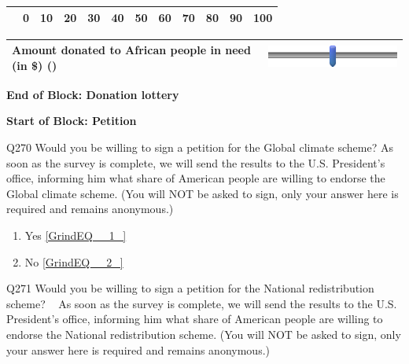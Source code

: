\documentclass{article} %
\begin{document}
\begin{tabular}{|p{2.2in}|p{0.2in}|p{0.2in}|p{0.2in}|p{0.2in}|p{0.2in}|p{0.2in}|p{0.2in}|p{0.2in}|p{0.2in}|p{0.2in}|p{0.2in}|} \hline 
 & 0 & 10 & 20 & 30 & 40 & 50 & 60 & 70 & 80 & 90 & 100 \\ \hline 
\end{tabular}



\begin{tabular}{|p{2.2in}|p{2.2in}|} \hline 
Amount donated to African people in need (in \$) () & \includegraphics*[width=2.08in, height=0.33in]{image10} \\ \hline 
\end{tabular}



\noindent 

\noindent \textbf{End of Block: Donation lottery}

\noindent \textbf{}

\noindent \textbf{Start of Block: Petition}

\noindent 

\noindent Q270 Would you be willing to sign a petition for the Global climate scheme? As soon as the survey is complete, we will send the results to the U.S. President's office, informing him what share of American people are willing to endorse the Global climate scheme. (You will NOT be asked to sign, only your answer here is required and remains anonymous.) 

\begin{enumerate}
\item  Yes  \eqref{GrindEQ__1_} 

\item  No  \eqref{GrindEQ__2_} 
\end{enumerate}

\noindent 

\noindent 

\noindent 

\noindent Q271 Would you be willing to sign a petition for the National redistribution scheme? ~  As soon as the survey is complete, we will send the results to the U.S. President's office, informing him what share of American people are willing to endorse the National redistribution scheme. (You will NOT be asked to sign, only your answer here is required and remains anonymous.) 
\end{document}
